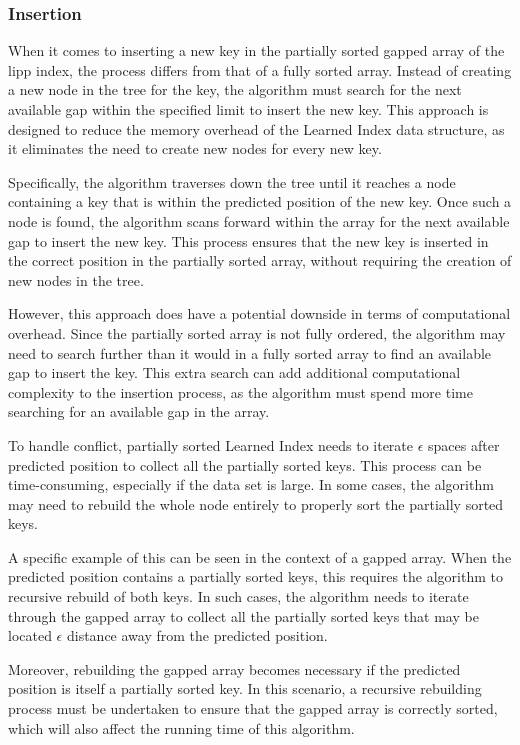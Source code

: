 \documentclass[11pt,a4paper]{article}
\newcommand{\learnindex}{\textsf{Learned Index}\xspace}
\newcommand{\conflict}{\textsf{conflict}\xspace}
\begin{document}
\subsubsection{Insertion}
When it comes to inserting a new key in the partially sorted gapped array of the \acrshort{lipp} index, the process differs from that of a fully sorted array. Instead of creating a new node in the tree for the key, the algorithm must search for the next available gap within the specified limit to insert the new key. This approach is designed to reduce the memory overhead of the \learnindex data structure, as it eliminates the need to create new nodes for every new key.

Specifically, the algorithm traverses down the tree until it reaches a node containing a key that is within the predicted position of the new key. Once such a node is found, the algorithm scans forward within the array for the next available gap to insert the new key. This process ensures that the new key is inserted in the correct position in the partially sorted array, without requiring the creation of new nodes in the tree.

However, this approach does have a potential downside in terms of computational overhead. Since the partially sorted array is not fully ordered, the algorithm may need to search further than it would in a fully sorted array to find an available gap to insert the key. This extra search can add additional computational complexity to the insertion process, as the algorithm must spend more time searching for an available gap in the array.

To handle \conflict, partially sorted \learnindex needs to iterate $\epsilon$ spaces after predicted position to collect all the partially sorted keys. This process can be time-consuming, especially if the data set is large. In some cases, the algorithm may need to rebuild the whole node entirely to properly sort the partially sorted keys.

A specific example of this can be seen in the context of a gapped array. When the predicted position contains a partially sorted keys, this requires the algorithm to recursive rebuild of both keys. In such cases, the algorithm needs to iterate through the gapped array to collect all the partially sorted keys that may be located $\epsilon$ distance away from the predicted position.

Moreover, rebuilding the gapped array becomes necessary if the predicted position is itself a partially sorted key. In this scenario, a recursive rebuilding process must be undertaken to ensure that the gapped array is correctly sorted, which will also affect the running time of this algorithm.
\end{document}
